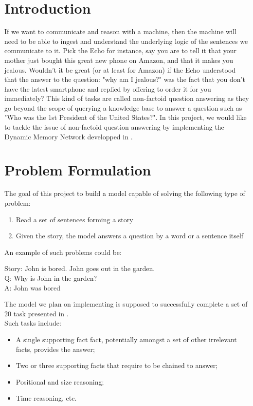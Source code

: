 \documentclass[submit]{harvardml}
\begin{document}
\section*{Introduction}

If we want to communicate and reason with a machine, then the machine will need to be able to ingest and understand the underlying logic of the sentences we communicate to it. Pick the Echo for instance, say you are to tell it that your mother just bought this great new phone on Amazon, and that it makes you jealous. Wouldn't it be great (or at least for Amazon) if the Echo understood that the answer to the question: "why am I jealous?" was the fact that you don't have the latest smartphone and replied by offering to order it for you immediately? This kind of tasks are called non-factoid question answering as they go beyond the scope of querying a knowledge base to answer a question such as "Who was the 1st President of the United States?". In this project, we would like to tackle the issue of non-factoid question answering by implementing the Dynamic Memory Network developped in \cite{dmn}.

\section{Problem Formulation}

The goal of this project to build a model capable of solving the following type of problem:

\begin{enumerate}
\item Read a set of sentences forming a story
\item Given the story, the model answers a question by a word or a sentence itself
\end{enumerate}
An example of such problems could be:

\begin{framed}
\begin{center}
Story: John is bored. John goes out in the garden.\\
Q: Why is John in the garden?\\
A: John was bored
\end{center}
\end{framed}

The model we plan on implementing is supposed to successfully complete a set of 20 task presented in \cite{aiqua}.\\

Such tasks include:
\begin{itemize}
\item A single supporting fact fact, potentially amongst a set of other irrelevant facts, provides the answer;
\item Two or three supporting facts that require to be chained to answer;
\item Positional and size reasoning;
\item Time reasoning, etc.
\end{itemize}
\end{document}
